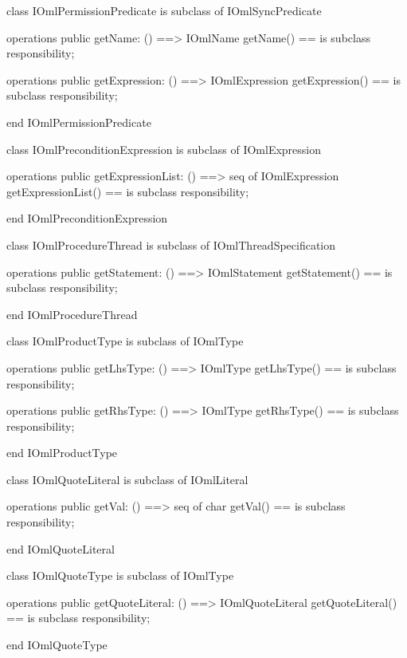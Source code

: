 \begin{vdm_al}
class IOmlPermissionPredicate
 is subclass of IOmlSyncPredicate

operations
  public getName: () ==> IOmlName
  getName() == is subclass responsibility;

operations
  public getExpression: () ==> IOmlExpression
  getExpression() == is subclass responsibility;

end IOmlPermissionPredicate
\end{vdm_al}

\begin{vdm_al}
class IOmlPreconditionExpression
 is subclass of IOmlExpression

operations
  public getExpressionList: () ==> seq of IOmlExpression
  getExpressionList() == is subclass responsibility;

end IOmlPreconditionExpression
\end{vdm_al}

\begin{vdm_al}
class IOmlProcedureThread
 is subclass of IOmlThreadSpecification

operations
  public getStatement: () ==> IOmlStatement
  getStatement() == is subclass responsibility;

end IOmlProcedureThread
\end{vdm_al}

\begin{vdm_al}
class IOmlProductType
 is subclass of IOmlType

operations
  public getLhsType: () ==> IOmlType
  getLhsType() == is subclass responsibility;

operations
  public getRhsType: () ==> IOmlType
  getRhsType() == is subclass responsibility;

end IOmlProductType
\end{vdm_al}

\begin{vdm_al}
class IOmlQuoteLiteral
 is subclass of IOmlLiteral

operations
  public getVal: () ==> seq of char
  getVal() == is subclass responsibility;

end IOmlQuoteLiteral
\end{vdm_al}

\begin{vdm_al}
class IOmlQuoteType
 is subclass of IOmlType

operations
  public getQuoteLiteral: () ==> IOmlQuoteLiteral
  getQuoteLiteral() == is subclass responsibility;

end IOmlQuoteType
\end{vdm_al}

